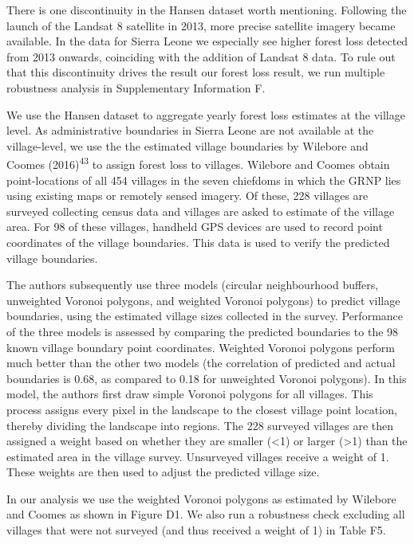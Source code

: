 \documentclass[
]{article}
\begin{document}
There is one discontinuity in the Hansen dataset worth mentioning.
Following the launch of the Landsat 8 satellite in 2013, more precise
satellite imagery became available. In the data for Sierra Leone we
especially see higher forest loss detected from 2013 onwards, coinciding
with the addition of Landsat 8 data. To rule out that this discontinuity
drives the result our forest loss result, we run multiple robustness
analysis in Supplementary Information F.

We use the Hansen dataset to aggregate yearly forest loss estimates at
the village level. As administrative boundaries in Sierra Leone are not
available at the village-level, we use the the estimated village
boundaries by Wilebore and Coomes (2016)\textsuperscript{43} to assign
forest loss to villages. Wilebore and Coomes obtain point-locations of
all 454 villages in the seven chiefdoms in which the GRNP lies using
existing maps or remotely sensed imagery. Of these, 228 villages are
surveyed collecting census data and villages are asked to estimate of
the village area. For 98 of these villages, handheld GPS devices are
used to record point coordinates of the village boundaries. This data is
used to verify the predicted village boundaries.

The authors subsequently use three models (circular neighbourhood
buffers, unweighted Voronoi polygons, and weighted Voronoi polygons) to
predict village boundaries, using the estimated village sizes collected
in the survey. Performance of the three models is assessed by comparing
the predicted boundaries to the 98 known village boundary point
coordinates. Weighted Voronoi polygons perform much better than the
other two models (the correlation of predicted and actual boundaries is
0.68, as compared to 0.18 for unweighted Voronoi polygons). In this
model, the authors first draw simple Voronoi polygons for all villages.
This process assigns every pixel in the landscape to the closest village
point location, thereby dividing the landscape into regions. The 228
surveyed villages are then assigned a weight based on whether they are
smaller (\textless1) or larger (\textgreater1) than the estimated area
in the village survey. Unsurveyed villages receive a weight of 1. These
weights are then used to adjust the predicted village size.

In our analysis we use the weighted Voronoi polygons as estimated by
Wilebore and Coomes as shown in Figure D1. We also run a robustness
check excluding all villages that were not surveyed (and thus received a
weight of 1) in Table F5.
\end{document}
